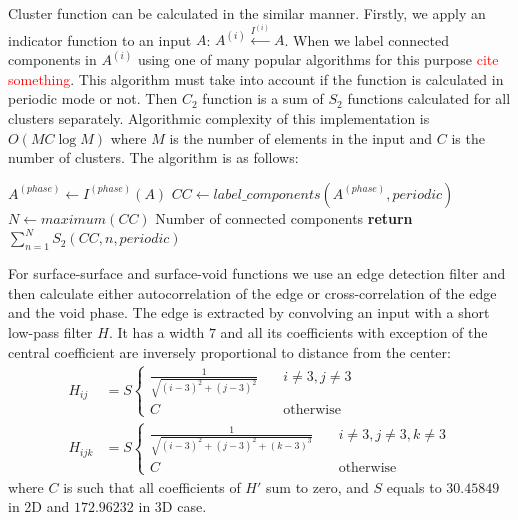 \documentclass[reprint,amsmath,amssymb,aps,pre,showkeys,showpacs,nofootinbib]{revtex4-1}
\begin{document}
Cluster function can be calculated in the similar manner. Firstly, we apply an
indicator function to an input $A$: $A^{(i)} \xleftarrow{I^{(i)}} A$. When we
label connected components in $A^{(i)}$ using one of many popular algorithms for
this purpose \textcolor{red}{cite something}. This algorithm must take into
account if the function is calculated in periodic mode or not. Then $C_2$
function is a sum of $S_2$ functions calculated for all clusters
separately. Algorithmic complexity of this implementation is $O(MC \log M)$
where $M$ is the number of elements in the input and $C$ is the number of
clusters. The algorithm is as follows:
\begin{algorithmic}[1]
  \State $A^{(phase)} \gets I^{(phase)} (A)$
  \State $CC \gets label\_components(A^{(phase)}, periodic)$
  \State $N \gets maximum(CC)$ \Comment Number of connected components
  \State \textbf{return} $\sum\limits_{n=1}^N S_2(CC, n, periodic)$
  \EndProcedure
\end{algorithmic}



For surface-surface and surface-void functions we use an edge detection filter
and then calculate either autocorrelation of the edge or cross-correlation of
the edge and the void phase. The edge is extracted by convolving an input with a
short low-pass filter $H$. It has a width $7$ and all its coefficients with
exception of the central coefficient are inversely proportional to distance
from the center:
\begin{equation}
  \begin{aligned}
    H_{ij} &= S \left\{
    \begin{array}{cc}
      \frac{1}{\sqrt{(i-3)^2 + (j-3)^2}} & \quad i \ne 3, j \ne 3 \\
      C & \quad \text{otherwise}
    \end{array}
    \right. \\
    H_{ijk} &= S \left\{
    \begin{array}{cc}
      \frac{1}{\sqrt{(i-3)^2 + (j-3)^2 + (k-3)^3}} & \quad i \ne 3, j \ne 3, k
      \ne 3 \\
      C & \quad \text{otherwise}
    \end{array}
    \right.
  \end{aligned}
  \label{eq:filter-7x7}
\end{equation}
where $C$ is such that all coefficients of $H'$ sum to zero, and $S$ equals to
$30.45849$ in 2D and $172.96232$ in 3D case.
\end{document}
